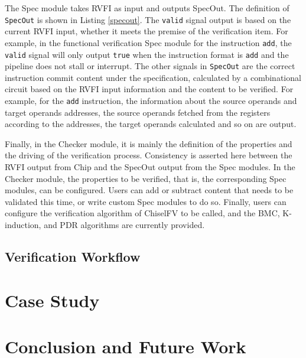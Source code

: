 \documentclass[conference]{IEEEtran}
\theoremstyle{definition}
\begin{document}
The Spec module takes RVFI as input and outputs SpecOut.
The definition of \verb|SpecOut| is shown in Listing \ref{specout}.
The \verb|valid| signal output is based on the current RVFI input, whether it meets the premise of the verification item.
For example, in the functional verification Spec module for the instruction \verb|add|, the \verb|valid| signal will only output \verb|true| when the instruction format is \verb|add| and the pipeline does not stall or interrupt.
The other signals in \verb|SpecOut| are the correct instruction commit content under the specification, calculated by a combinational circuit based on the RVFI input information and the content to be verified.
For example, for the \verb|add| instruction, the information about the source operands and target operands addresses, the source operands fetched from the registers according to the addresses, the target operands calculated and so on are output.

Finally, in the Checker module, it is mainly the definition of the properties and the driving of the verification process.
Consistency is asserted here between the RVFI output from Chip and the SpecOut output from the Spec modules.
In the Checker module, the properties to be verified, that is, the corresponding Spec modules, can be configured.
Users can add or subtract content that needs to be validated this time, or write custom Spec modules to do so.
Finally, users can configure the verification algorithm of ChiselFV to be called, and the BMC, K-induction, and PDR algorithms are currently provided.

\subsection{Verification Workflow}

\section{Case Study}

\section{Conclusion and Future Work}



\end{document}
